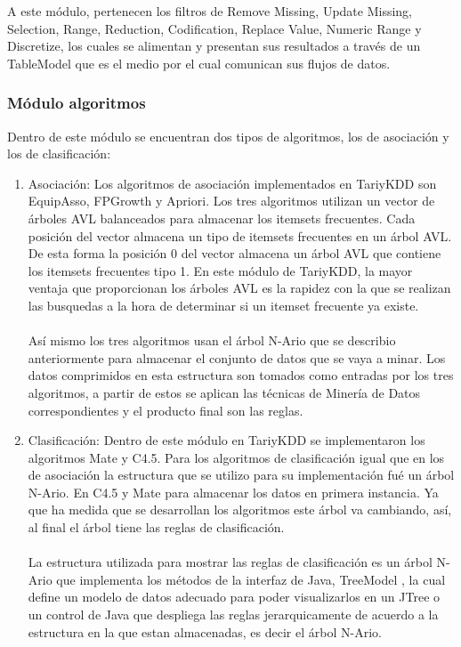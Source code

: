 A este m\'odulo, pertenecen los filtros de Remove Missing, Update Missing, Selection, Range, Reduction,
Codification, Replace Value, Numeric Range y Discretize, los cuales se alimentan y presentan sus resultados a
trav\'es de un TableModel que es el medio por el cual comunican sus flujos de datos.

\subsubsection{M\'odulo algoritmos}
Dentro de este m\'odulo se encuentran dos tipos de algoritmos, los de asociaci\'on y los de clasificaci\'on:

\begin{enumerate}
\item Asociaci\'on: Los algoritmos de asociaci\'on implementados en TariyKDD son EquipAsso, FPGrowth y Apriori.
Los tres algoritmos utilizan un vector de \'arboles AVL balanceados para almacenar los itemsets frecuentes. Cada
posici\'on del vector almacena un tipo de itemsets frecuentes en un \'arbol AVL. De esta forma la posici\'on 0 del
vector almacena un \'arbol AVL que contiene los itemsets frecuentes tipo 1. En este m\'odulo de TariyKDD, la mayor
ventaja que proporcionan los \'arboles AVL es la rapidez con la que se realizan las busquedas a la hora de 
determinar si un itemset frecuente ya existe.\\
\\
As\'i mismo los tres algoritmos usan el \'arbol N-Ario que se describio anteriormente para almacenar el conjunto
de datos que se vaya a minar. Los datos comprimidos en esta estructura son tomados como entradas por los tres
algoritmos, a partir de estos se aplican las t\'ecnicas de Miner\'ia de Datos correspondientes y el producto final
son las reglas.

\item Clasificaci\'on: Dentro de este m\'odulo en TariyKDD se implementaron los algoritmos Mate y C4.5. Para los
algoritmos de clasificaci\'on igual que en los de asociaci\'on la estructura que se utilizo para su 
implementaci\'on fu\'e un \'arbol N-Ario. En C4.5 y Mate para almacenar los datos en primera instancia. Ya que ha
medida que se desarrollan los algoritmos este \'arbol va cambiando, as\'i, al final el \'arbol tiene las reglas
de clasificaci\'on.\\
\\
La estructura utilizada para mostrar las reglas de clasificaci\'on es un \'arbol N-Ario que implementa los
m\'etodos de la interfaz de Java, TreeModel , la cual define un modelo de datos adecuado para poder visualizarlos
en un JTree o un control de Java que despliega las reglas jerarquicamente de acuerdo a la estructura en la que
estan almacenadas, es decir el \'arbol N-Ario.
\end{enumerate}

